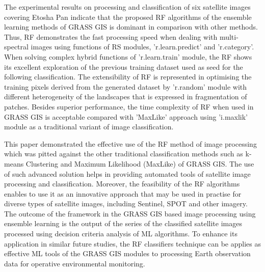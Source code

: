\documentclass[draft]{agujournal2019}
\begin{document}
The experimental results on processing and classification of six satellite images covering Etosha Pan indicate that the proposed RF algorithms of the ensemble learning methods of GRASS GIS is dominant in comparison with other methods. Thus, RF demonstrates the fast processing speed when dealing with multi-spectral images using functions of RS modules, 'r.learn.predict' and 'r.category'. When solving complex hybrid functions of 'r.learn.train' module, the RF shows its excellent exploration of the previous training dataset used as seed for the following classification. The extensibility of RF is represented in optimising the training pixels derived from the generated dataset by 'r.random' module with different heterogeneity of the landscapes that is expressed in fragmentation of patches. Besides superior performance, the time complexity of RF when used in GRASS GIS is acceptable compared with 'MaxLike' approach using 'i.maxlik' module as a traditional variant of image classification.

This paper demonstrated the effective use of the RF method of image processing which was pitted against the other traditional classification methods such as k-means Clustering and Maximum Likelihood (MaxLike) of GRASS GIS. The use of such advanced solution helps in providing automated tools of satellite image processing and classification. Moreover, the feasibility of the RF algorithms enables to use it as an innovative approach that may be used in practise for diverse types of satellite images, including Sentinel, SPOT and other imagery. The outcome of the framework in the GRASS GIS based image processing using ensemble learning is the output of the series of the classified satellite images processed using decision criteria analysis of ML algorithms. To enhance its application in similar future studies, the RF classifiers technique can be applies as effective ML tools of the GRASS GIS modules to processing Earth observation data for operative environmental monitoring.
\end{document}
